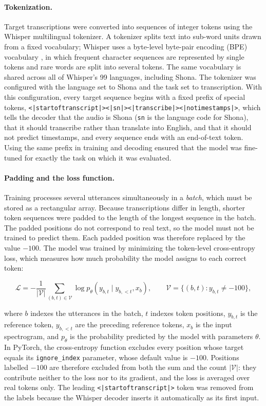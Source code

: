 \paragraph{Tokenization.}
Target transcriptions were converted into sequences of integer tokens using the
Whisper multilingual tokenizer. A tokenizer splits text into sub-word units
drawn from a fixed vocabulary; Whisper uses a byte-level byte-pair encoding (BPE)
vocabulary \citep{Sennrich2016, Radford2022}, in which frequent character
sequences are represented by single tokens and rare words are split into several
tokens. The same vocabulary is shared across all of Whisper's 99 languages,
including Shona. The tokenizer was configured with the language set to Shona and
the task set to transcription. With this configuration, every target sequence
begins with a fixed prefix of special tokens,
\texttt{<|startoftranscript|><|sn|><|transcribe|><|notimestamps|>}, which tells
the decoder that the audio is Shona (\texttt{sn} is the language code for Shona),
that it should transcribe rather than translate into English, and that it should
not predict timestamps, and every sequence ends with an end-of-text token. Using
the same prefix in training and decoding ensured that the model was fine-tuned
for exactly the task on which it was evaluated.

\paragraph{Padding and the loss function.}
Training processes several utterances simultaneously in a \emph{batch}, which
must be stored as a rectangular array. Because transcriptions differ in length,
shorter token sequences were padded to the length of the longest sequence in the
batch. The padded positions do not correspond to real text, so the model must not
be trained to predict them. Each padded position was therefore replaced by the
value $-100$. The model was trained by minimizing the token-level cross-entropy
loss, which measures how much probability the model assigns to each correct
token:

\begin{equation}
    \mathcal{L} = -\frac{1}{|\mathcal{V}|}\sum_{(b,t)\in\mathcal{V}}
    \log p_\theta\!\left(y_{b,t} \mid y_{b,<t}, x_b\right),
    \qquad
    \mathcal{V} = \{(b,t) : y_{b,t} \neq -100\},
    \label{eq:ce-loss}
\end{equation}

where $b$ indexes the utterances in the batch, $t$ indexes token positions,
$y_{b,t}$ is the reference token, $y_{b,<t}$ are the preceding reference tokens,
$x_b$ is the input spectrogram, and $p_\theta$ is the probability predicted by the
model with parameters $\theta$. In PyTorch, the cross-entropy function excludes
every position whose target equals its \texttt{ignore\_index} parameter, whose
default value is $-100$. Positions labelled $-100$ are therefore excluded from both
the sum and the count $|\mathcal{V}|$: they contribute neither to the loss nor to
its gradient, and the loss is averaged over real tokens only. The leading
\texttt{<|startoftranscript|>} token was removed from the labels because the
Whisper decoder inserts it automatically as its first input.

